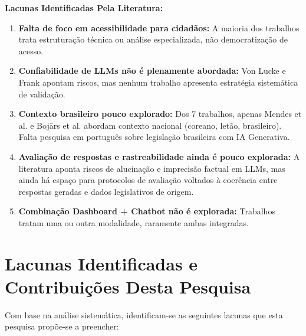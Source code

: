 \textbf{Lacunas Identificadas Pela Literatura:}

\begin{enumerate}
    \item \textbf{Falta de foco em acessibilidade para cidadãos:} A maioria dos trabalhos trata estruturação técnica ou análise especializada, não democratização de acesso.

    \item \textbf{Confiabilidade de LLMs não é plenamente abordada:} Von Lucke e Frank apontam riscos, mas nenhum trabalho apresenta estratégia sistemática de validação.

    \item \textbf{Contexto brasileiro pouco explorado:} Dos 7 trabalhos, apenas Mendes et al. e Bojārs et al. abordam contexto nacional (coreano, letão, brasileiro). Falta pesquisa em português sobre legislação brasileira com IA Generativa.

    \item \textbf{Avaliação de respostas e rastreabilidade ainda é pouco explorada:} A literatura aponta riscos de alucinação e imprecisão factual em LLMs, mas ainda há espaço para protocolos de avaliação voltados à coerência entre respostas geradas e dados legislativos de origem.

    \item \textbf{Combinação Dashboard + Chatbot não é explorada:} Trabalhos tratam uma ou outra modalidade, raramente ambas integradas.
\end{enumerate}

\section{Lacunas Identificadas e Contribuições Desta Pesquisa}

Com base na análise sistemática, identificam-se as seguintes lacunas que esta pesquisa propõe-se a preencher:


